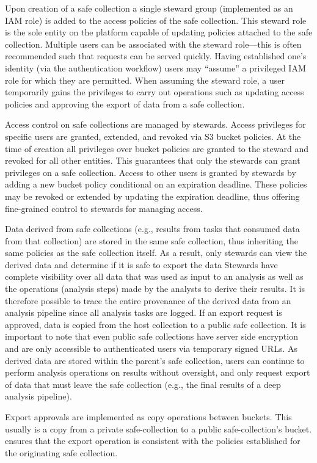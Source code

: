 Upon creation of a safe collection a single steward group (implemented as an IAM role) is added to the
access policies of the safe collection. This steward role is the sole entity on the platform capable of
updating policies attached to the safe collection.
Multiple users can be associated with the steward role---this is often recommended such
that requests can be served quickly.
Having established one's identity (via the \NAME authentication workflow) users
may ``assume'' a privileged IAM role for which they are permitted.
When assuming the steward role, a user temporarily gains the privileges to carry out operations such
as updating access policies and approving the export of data from a safe collection.

Access control on safe collections are managed by stewards. Access privileges for specific users
are granted, extended, and revoked via S3 bucket policies. At the time of creation all
privileges over bucket policies are granted to the steward and revoked for all other entities. This
guarantees that only the stewards can grant privileges on a safe collection. Access to other users
is granted by stewards by adding a new bucket policy conditional on an expiration deadline. These policies may be revoked or
extended by updating the expiration deadline, thus offering fine-grained control to stewards for managing
access.

Data derived from safe collections (e.g., results from tasks that consumed data from that collection)
are stored in the same safe collection, thus inheriting the same policies as the safe collection itself.
As a result, only stewards can view the derived data and determine if it is safe to
export the data
Stewards have complete visibility over all data that was used as input to an analysis as
well as the operations (analysis steps) made by the analysts to derive their results.
It is therefore possible to trace the entire provenance of the derived data from an
analysis pipeline since all analysis tasks are logged.
If an export request is approved, data is copied from the host collection to a public safe collection.
It is important to note that even public safe collections have server side encryption and
are only accessible to authenticated users via temporary signed URLs.
As derived data are stored within the parent's safe collection, users can continue
to perform analysis operations on results without oversight,
and only request export of data that must leave the safe collection (e.g., the
final results of a deep analysis pipeline).

Export approvals are implemented as copy operations between buckets. This usually is a copy from a
private safe-collection to a public safe-collection's bucket.
\NAME ensures that the export operation is consistent with the policies established for the originating
safe collection.


